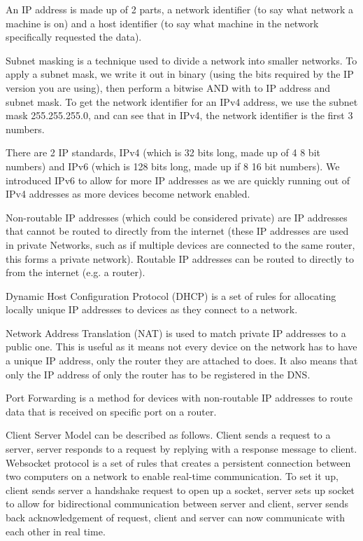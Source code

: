   \noindent
  An IP address is made up of 2 parts, a network identifier (to say what network a machine is on) and a host identifier (to say what machine in the network specifically requested the data).
  
  \noindent
  Subnet masking is a technique used to divide a network into smaller networks. To apply a subnet mask, we write it out in binary (using the bits required by the IP version you are using), then perform a bitwise AND with to IP address and subnet mask. To get the network identifier for an IPv4 address, we use the subnet mask 255.255.255.0, and can see that in IPv4, the network identifier is the first 3 numbers.
  
  \noindent
  There are 2 IP standards, IPv4 (which is 32 bits long, made up of 4 8 bit numbers) and IPv6 (which is 128 bits long, made up if 8 16 bit numbers). We introduced IPv6 to allow for more IP addresses as we are quickly running out of IPv4 addresses as more devices become network enabled.
  
  \noindent
  Non-routable IP addresses (which could be considered private) are IP addresses that cannot be routed to directly from the internet (these IP addresses are used in private Networks, such as if multiple devices are connected to the same router, this forms a private network). Routable IP addresses can be routed to directly to from the internet (e.g. a router).
  
  \noindent
  Dynamic Host Configuration Protocol (DHCP) is a set of rules for allocating locally unique IP addresses to devices as they connect to a network.
  
  \noindent
  Network Address Translation (NAT) is used to match private IP addresses to a public one. This is useful as it means not every device on the network has to have a unique IP address, only the router they are attached to does. It also means that only the IP address of only the router has to be registered in the DNS.
  
  \noindent
  Port Forwarding is a method for devices with non-routable IP addresses to route data that is received on specific port on a router.
  
  \noindent
  Client Server Model can be described as follows. Client sends a request to a server, server responds to a request by replying with a response message to client. Websocket protocol is a set of rules that creates a persistent connection between two computers on a network to enable real-time communication. To set it up, client sends server a handshake request to open up a socket, server sets up socket to allow for bidirectional communication between server and client, server sends back acknowledgement of request, client and server can now communicate with each other in real time.
  
